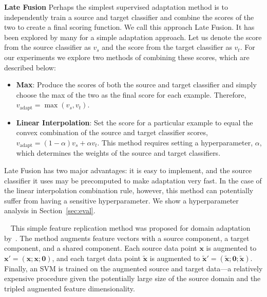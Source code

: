 {\bf Late Fusion}
Perhaps the simplest supervised adaptation method is to independently train a source and target classifier and combine the scores of the two to create a final scoring function. 
We call this approach Late Fusion. It has been explored by many for a simple adaptation approach.
Let us denote the score from the source classifier as $v_s$ and the score from the target classifier as $v_t$.  For our experiments we explore two methods of combining these scores, which are described below:
\begin{itemize}
\item {\bf Max}: Produce the scores of both the source and target classifier and simply choose the max of the two as the final score for each example. Therefore, $v_{\text{adapt}} = \max(v_s, v_t)$.
\item {\bf Linear Interpolation}: Set the score for a particular example to equal the convex combination of the source and target classifier scores,  $v_{\text{adapt}} = (1-\alpha)v_{s} + \alpha v_{t}$. This method requires setting a hyperparameter, $\alpha$, which determines the weights of the source and target classifiers.
\end{itemize}

Late Fusion has two major advantages: it is easy to implement, and the source classifier it uses may be precomputed to make adaptation very fast. In the case of the linear interpolation combination rule, however, this method can potentially suffer from having a sensitive hyperparameter. We show a hyperparameter analysis in Section~\ref{sec:eval}.

{\bf \daume~\cite{daume}}
This simple feature replication method was proposed for domain adaptation by~\cite{daume}.
The method augments feature vectors with a source component, a target component, and a shared component.
Each source data point $\bm{x}$ is augmented to $\bm{x}' = (\bm{x}; \bm{x}; \bm{0})$,
and each target data point $\tilde{\bm{x}}$ is augmented to $\tilde{\bm{x}}' = (\tilde{\bm{x}}; \bm{0}; \tilde{\bm{x}})$.
Finally, an SVM is trained on the augmented source and target data---a relatively expensive procedure given the potentially large size of the source domain and the tripled augmented feature dimensionality.

